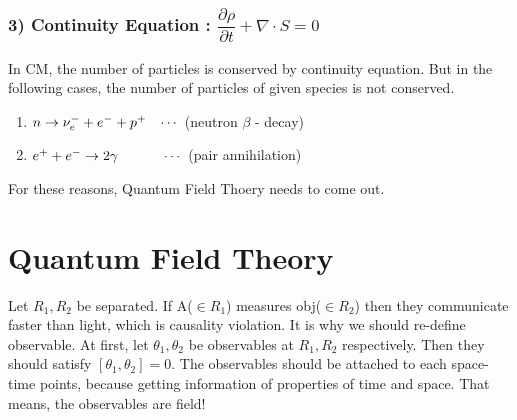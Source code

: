 \documentclass[11pt,letterpaper]{article}
\begin{document}
\VS

\subsubsection*{3) Continuity Equation : $\dfrac{\partial\rho}{\partial t} + \nabla\cdot S = 0 $}

In CM, the number of particles is conserved by continuity equation. But in the following cases, the number of particles of given species is not conserved.

\begin{enumerate}
\item $n \rightarrow \nu^-_e + e^- + p^+ \hspace{0.3cm} \cdots$ (neutron $\beta$ - decay)
\item $e^+ + e^- \rightarrow 2\gamma \hspace{1.1cm} \cdots$ (pair annihilation)
\end{enumerate}

For these reasons, Quantum Field Thoery needs to come out.

\newpage

\section*{Quantum Field Theory}

Let $R_1,R_2$ be separated. If A($\in R_1$) measures obj($\in R_2$) then they communicate faster than light, which is causality violation.
It is why we should re-define observable.
At first, let $\theta_{1}, \theta_{2}$ be observables at $R_{1},R_{2}$ respectively. Then they should satisfy $\left[\theta_{1} , \theta_{2}\right]=0$.
The observables should be attached to each space-time points, because getting information of properties of time and space.
That means, the observables are field!

\vs
\end{document}
